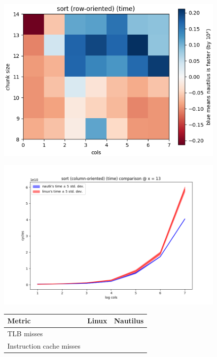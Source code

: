 \documentclass[conference]{IEEEtran}
\begin{document}
\begin{figure}[t]
  \centering
  \begin{minipage}{0.32\linewidth}
    \centering
    \includegraphics[width=1\linewidth]{../plots/sort_2d.png}
    \label{fig:sort2d}
  \end{minipage}
  \begin{minipage}{0.32\linewidth}
    \centering
  \includegraphics[width=1\linewidth]{../plots/sort.png}
    \label{fig:colsort}
  \end{minipage}
  \begin{minipage}{0.32\linewidth}
    \centering
      \begin{tabular}{l || r | r }
        \textbf{Metric}  & \textbf{Linux} & \textbf{Nautilus} \\
        \hline\hline
        TLB misses               & \todo{} & \todo{} \\
        Instruction cache misses & \todo{} & \todo{}  \\
      \end{tabular}


\end{minipage}
\end{figure}
\end{document}
